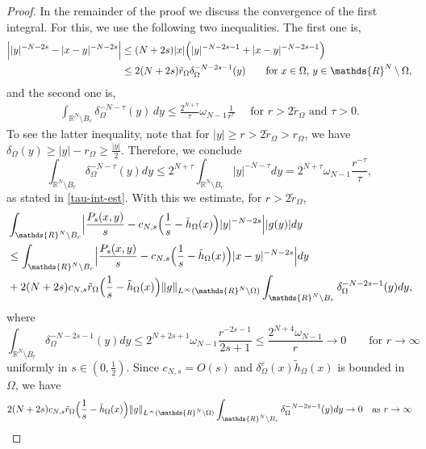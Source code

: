 \documentclass[notitlepage,11pt,reqno]{amsart}
\theoremstyle{definition}
\numberwithin{equation}{section}
\newcommand{\eps}{{\varepsilon}}
\newcommand{\RR}{\mathds{R}}
\begin{document}
\begin{proof}
In the remainder of the proof we discuss the convergence of the first integral. For this, we use the following two inequalities. The first one is, 
\begin{align*}
\Bigl| |y|^{-N-2s}- |x-y|^{-N-2s}\Bigr| &\le (N+2s) |x| \Bigl(|y|^{-N-2s-1}+|x-y|^{-N-2s-1}\Bigr)\\
&\le 2 (N+2s) \tilde{r}_\Omega \delta_\Omega^{-N-2s-1}(y) \qquad \text{for $x \in \Omega$, $y \in \RR^N \setminus \Omega$,}  
\end{align*}
and the second one is, 
\begin{align}\label{tau-int-est}
    \int_{\RR^N\setminus B_{r}}\delta^{-N-\tau}_{\Omega}(y)\, dy\leq \frac{2^{N+\tau}}{\tau}\omega_{N-1}\frac{1}{r^{\tau}} \quad\text{ for $r>2\tilde r_{\Omega}$ and $\tau>0$.}
\end{align}
To see the latter inequality, note that for $|y|\geq r>2\tilde r_{\Omega}>r_{\Omega}$, we have $\delta_{\Omega}(y)\geq |y|-r_{\Omega}\geq \frac{|y|}{2}.$ Therefore, we conclude
\begin{equation*}
  \int_{\RR^N \setminus B_{r}} \delta_\Omega^{-N-\tau}(y)dy \le 2^{N+\tau} \int_{\RR^N \setminus B_{r}} |y|^{-N-\tau}dy= 2^{N+\tau} \omega_{N-1} \frac{r^{-\tau}}{\tau},
\end{equation*}
as stated in \eqref{tau-int-est}. With this we estimate, for $r>2\tilde{r}_{\Omega}$,
\begin{align}
&\int_{\RR^N \setminus B_{r}} \Bigl|\frac{P_s(x,y)}{s}-c_{N,s}\Bigl(\frac{1}{s} - \tilde h_\Omega(x)\Bigr) |y|^{-N-2s}\Bigr| |g(y)|dy\notag\\
  &\le \int_{\RR^N  \setminus B_{r}} \Bigl|\frac{P_s(x,y)}{s}-c_{N,s}\Bigl(\frac{1}{s} - \tilde h_\Omega(x)\Bigr) |x-y|^{-N-2s}\Bigr|dy\label{estimate remainder}\\
  &+ 2(N+2s) c_{N,s} \tilde{r}_\Omega \Bigl(\frac{1}{s} - \tilde h_\Omega(x)\Bigr)  \|g\|_{L^\infty(\RR^N \setminus \Omega)} \int_{\RR^N  \setminus B_{r}}  \delta^{-N-2s-1}_\Omega(y)dy,\notag          
\end{align}
where
$$
\int_{\RR^N \setminus B_{r}} \delta_\Omega^{-N-2s-1}(y) dy \le 
2^{N+2s + 1} \omega_{N-1} \frac{r^{-2s-1}}{2s+1}\le 
\frac{2^{N+4} \omega_{N-1}}{r} \to 0 \qquad \text{for $r \to \infty$}     
$$
uniformly in $s \in (0,\frac{1}{2})$. Since $c_{N,s}=O(s)$ and $\delta_{\Omega}^{\eps}(x)\tilde{h}_{\Omega}(x)$ is bounded in $\Omega$, we have
\begin{align*}
    2(N+2s) c_{N,s} \tilde{r}_\Omega \Bigl(\frac{1}{s} - \tilde h_\Omega(x)\Bigr)  \|g\|_{L^\infty(\RR^N \setminus \Omega)} \int_{\RR^N  \setminus B_{r}}  \delta^{-N-2s-1}_\Omega(y)dy\to 0 \quad\text{as $r\to \infty$}

\end{align*}
\end{proof}
\end{document}
